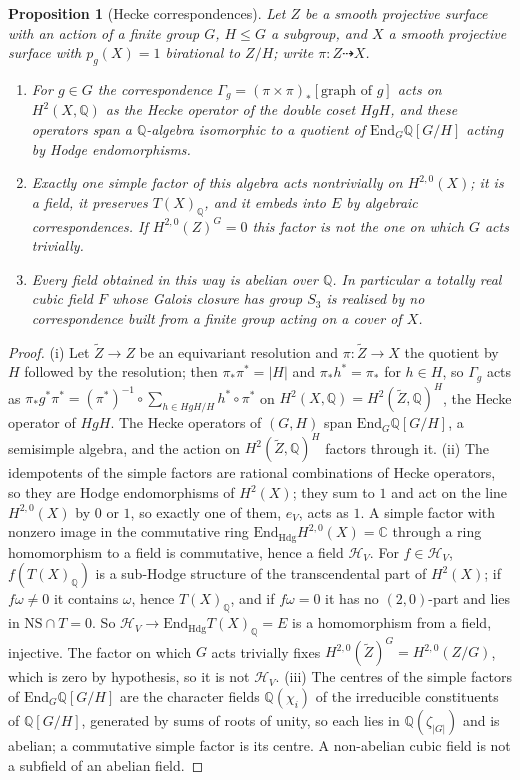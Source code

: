 \documentclass[11pt,reqno]{amsart}
\numberwithin{equation}{section}
\theoremstyle{plain}
\newtheorem{proposition}[theorem]{Proposition}
\theoremstyle{definition}
\newcommand{\QQ}{\mathbb{Q}}
\newcommand{\CC}{\mathbb{C}}
\newcommand{\Hdg}{\mathrm{Hdg}}
\newcommand{\NS}{\mathrm{NS}}
\newcommand{\End}{\mathrm{End}}
\begin{document}
\begin{proposition}[Hecke correspondences]\label{prop:hecke}
Let $Z$ be a smooth projective surface with an action of a finite group $G$, $H\le G$ a subgroup, and $X$ a smooth projective surface with $p_{g}(X)=1$ birational to $Z/H$; write $\pi\colon Z\dashrightarrow X$.
\begin{enumerate}[label=\textup{(\roman*)},leftmargin=2.4em,itemsep=2pt]
\item For $g\in G$ the correspondence $\Gamma_{g}=(\pi\times\pi)_{*}[\text{graph of }g]$ acts on $H^{2}(X,\QQ)$ as the Hecke operator of the double coset $HgH$, and these operators span a $\QQ$-algebra isomorphic to a quotient of $\End_{G}\QQ[G/H]$ acting by Hodge endomorphisms.
\item Exactly one simple factor of this algebra acts nontrivially on $H^{2,0}(X)$; it is a field, it preserves $T(X)_{\QQ}$, and it embeds into $E$ by algebraic correspondences. If $H^{2,0}(Z)^{G}=0$ this factor is not the one on which $G$ acts trivially.
\item Every field obtained in this way is abelian over $\QQ$. In particular a totally real cubic field $F$ whose Galois closure has group $S_{3}$ is realised by no correspondence built from a finite group acting on a cover of $X$.
\end{enumerate}
\end{proposition}

\begin{proof}
(i) Let $\tilde Z\to Z$ be an equivariant resolution and $\pi\colon\tilde Z\to X$ the quotient by $H$ followed by the resolution; then $\pi_{*}\pi^{*}=|H|$ and $\pi_{*}h^{*}=\pi_{*}$ for $h\in H$, so $\Gamma_{g}$ acts as $\pi_{*}g^{*}\pi^{*}=(\pi^{*})^{-1}\circ\sum_{h\in HgH/H}h^{*}\circ\pi^{*}$ on $H^{2}(X,\QQ)=H^{2}(\tilde Z,\QQ)^{H}$, the Hecke operator of $HgH$. The Hecke operators of $(G,H)$ span $\End_{G}\QQ[G/H]$, a semisimple algebra, and the action on $H^{2}(\tilde Z,\QQ)^{H}$ factors through it. (ii) The idempotents of the simple factors are rational combinations of Hecke operators, so they are Hodge endomorphisms of $H^{2}(X)$; they sum to $1$ and act on the line $H^{2,0}(X)$ by $0$ or $1$, so exactly one of them, $e_{V}$, acts as $1$. A simple factor with nonzero image in the commutative ring $\End_{\Hdg}H^{2,0}(X)=\CC$ through a ring homomorphism to a field is commutative, hence a field $\mathcal{H}_{V}$. For $f\in\mathcal{H}_{V}$, $f(T(X)_{\QQ})$ is a sub-Hodge structure of the transcendental part of $H^{2}(X)$; if $f\omega\ne0$ it contains $\omega$, hence $T(X)_{\QQ}$, and if $f\omega=0$ it has no $(2,0)$-part and lies in $\NS\cap T=0$. So $\mathcal{H}_{V}\to\End_{\Hdg}T(X)_{\QQ}=E$ is a homomorphism from a field, injective. The factor on which $G$ acts trivially fixes $H^{2,0}(\tilde Z)^{G}=H^{2,0}(Z/G)$, which is zero by hypothesis, so it is not $\mathcal{H}_{V}$. (iii) The centres of the simple factors of $\End_{G}\QQ[G/H]$ are the character fields $\QQ(\chi_{i})$ of the irreducible constituents of $\QQ[G/H]$, generated by sums of roots of unity, so each lies in $\QQ(\zeta_{|G|})$ and is abelian; a commutative simple factor is its centre. A non-abelian cubic field is not a subfield of an abelian field.
\end{proof}
\end{document}
